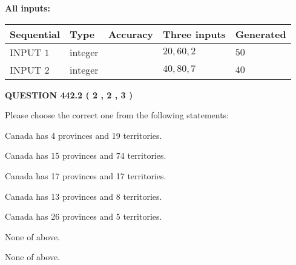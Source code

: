 \documentclass[12pt]{article}
\begin{document}
   
   
   
\noindent{}
   
   
   
   
\noindent\vspace{0.1in}\hspace{-0.08in} {\textbf{\Large{All inputs: }}}
   
   
  
  
\noindent\begin{tabular}{|l|l|l|l|l|}
\hline
 Sequential & Type & Accuracy & Three inputs & Generated \\ 
\hline
 
 
  INPUT $  1 $ & integer &  & $
 20
 , 
 60
 , 
 2
 $ & $ 50 $ 
 \\  \hline  
 
 
  INPUT $  2 $ & integer &  & $
 40
 , 
 80
 , 
 7
 $ & $ 40 $ 
 \\  \hline  
 \end{tabular}
   
   
  
\vspace{0.2in}
  
{\textbf{\Large{QUESTION
442.2 
 ( 2 , 2 , 3 )
}}}
  
  
Please choose the correct one from the following statements:
 
 
Canada has   4 provinces and  19 territories.
 
 
Canada has  15 provinces and  74 territories.
 
 
Canada has  17 provinces and  17 territories.
 
 
Canada has  13 provinces and  8 territories.
 
 
Canada has  26 provinces and  5 territories.
 
 
 None of above.
 
 
\noindent{}
 
 
 None of above.
 
 
\noindent{}
 
 
   
   
   
\end{document}

